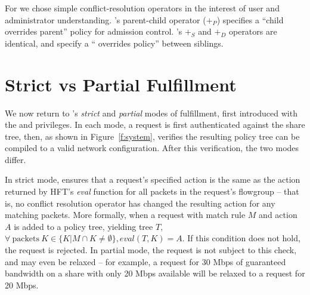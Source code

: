 For \sys we chose simple conflict-resolution operators in the
interest of user and administrator understanding.
\sys's parent-child operator ($+_P$) specifies a ``child
overrides parent'' policy for admission control. \sys's $+_S$ and $+_D$
operators are identical, and specify a `` overrides
 policy'' between siblings.



\section{Strict vs Partial Fulfillment}
\label{sec:strict-partial}

We now return to \sys's \emph{strict} and \emph{partial} modes of
fulfillment, first introduced with the  and 
privileges. In each mode, a request is first authenticated against the
share tree, then, as shown in Figure~\ref{f:system}, \sys verifies the resulting policy tree can be
compiled to a valid network configuration.
After this verification, the two modes differ.

In strict mode, \sys ensures that a request's specified action
is the same as the action returned by HFT's \emph{eval}
function for all packets in the request's flowgroup -- that is, no
conflict resolution operator has changed the resulting action for
any matching packets.
More formally, when a request with match rule $M$ and action
$A$ is added to a policy tree, yielding tree $T$,
$\forall\ \mathrm{packets}\ K \in \{ K | M \cap K \ne \emptyset \}, \mathit{eval} (T, K) = A$.
If this condition does not hold, the request is rejected.
In partial mode, the request is not subject to this check, and may
even be relaxed -- for example, a request for 30 Mbps of guaranteed
bandwidth on a share with only 20 Mbps available will be relaxed
to a request for 20 Mbps. 

